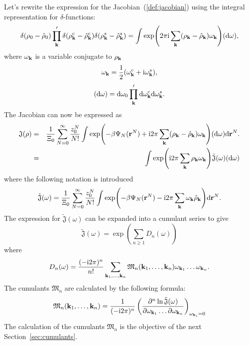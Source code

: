 Let's rewrite the expression for the Jacobian~(\ref{def:jacobian}) using the integral representation for $\delta$-functions:
\begin{equation}
	\delta(\rho_0 - \hat{\rho}_0) \prod_{\vb k}' \delta(\rho_{\vb k}^c - \hat{\rho}_{\vb k}^c) \delta(\rho_{\vb k}^s - \hat{\rho}_{\vb k}^s) = \int \exp(2\pi{\rm i}\sum_{\vb k} (\rho_{\vb k} - \hat{\rho}_{\vb k}) \omega_{\bf k}) ({\rm d} \omega),
\end{equation}
where $\omega_{\vb k}$ is a variable conjugate to $\rho_{\vb k}$
\begin{equation}
	\omega_{\vb k} = \frac12(\omega_{\vb k}^c + {\rm i} \omega_{\vb k}^s),
\end{equation}
\begin{equation}
	({\rm d}\omega) = {\rm d} \omega_0 \prod_{\vb k}' {\rm d} \omega_{\vb k}^c {\rm d} \omega_{\vb k}^s.
\end{equation}
The Jacobian can now be expressed as
\begin{eqnarray}
	\mathfrak{J}(\rho) &=& \frac{1}{\Xi_0}\sum_{N=0}^{\infty} \frac{z_0^N}{N!}\int \exp(-\beta\Psi_N(\vb r^N) + {\rm i}2\pi \sum_{\vb k}(\rho_{\vb k} - \hat{\rho}_{\vb k})\omega_{\vb k}) ({\rm d} \omega) {\rm d}{\vb r^N}.
	\nonumber\\
	&=& \int \exp({\rm i} 2\pi \sum_{\vb k}\rho_{\vb k}\omega_{\vb k}) \tilde{\mathfrak{J}}(\omega) ({\rm d} \omega)
\end{eqnarray}
where the following notation is introduced
\begin{equation}
	\label{def:jacob_tilde}
	\tilde{\mathfrak{J}}(\omega) = \frac{1}{\Xi_0}\sum_{N=0}^{\infty} \frac{z_0^N}{N!}\int \exp(-\beta\Psi_N(\vb r^N) - {\rm i}2\pi \sum_{\vb k} \omega_{\vb k}\hat{\rho}_{\vb k}) {\rm d}{\vb r^N}.
\end{equation}
The expression for $\tilde{\mathfrak{J}}(\omega)$ can be expanded into a cumulant series to give
\begin{equation}
	\tilde{\mathfrak{J}}(\omega) = \exp(\sum_{n\geq 1} D_n(\omega))
\end{equation}
where 
\begin{equation}
	D_n(\omega) = \frac{(-{\rm i}2\pi)^n}{n!}\sum_{\vb{k}_1,\dotsc,\vb{k}_n}\mathfrak{M}_n(\vb k_1, \dotsc, \vb k_n) \omega_{{\vb k}_1}\dotsc \omega_{{\vb k}_n}.
\end{equation}
The cumulants $\mathfrak{M}_n$ are calculated by the following formula:
\begin{equation}
	\label{def:cumulant}
	\mathfrak{M}_n(\vb k_1, \dotsc, \vb k_n) = \frac{1}{(-{\rm i}2\pi)^n} 
	\left(
	\frac{\partial^n \ln \tilde{\mathfrak{J}}(\omega)}{\partial\omega_{{\vb k}_1} \dotsc \partial\omega_{{\vb k}_n}}
	\right)_{\omega_{{\vb k}_i}=0}
\end{equation}
The calculation of the cumulants $\mathfrak{M}_n$ is the objective of the next Section~\ref{sec:cumulants}.

